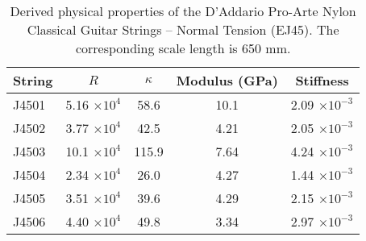 \begin{table}%
  \centering
  \caption{\label{tbl:ej45_props} Derived physical properties of the D'Addario Pro-Arte Nylon Classical Guitar Strings -- Normal Tension (EJ45). The corresponding scale length is 650 mm.}
    \begin{tabular}{lcccc}
    \hline \hline
    String  & $R$ & $\kappa$ & Modulus (GPa) & Stiffness \\
    \hline
    J4501 & 5.16 $\times 10^{4}$ & 58.6  & 10.1 & 2.09 $\times 10^{-3}$ \\
    J4502 & 3.77 $\times 10^{4}$ & 42.5  & 4.21 & 2.05 $\times 10^{-3}$ \\
    J4503 & 10.1 $\times 10^{4}$ & 115.9 & 7.64 & 4.24 $\times 10^{-3}$ \\
    J4504 & 2.34 $\times 10^{4}$ & 26.0  & 4.27 & 1.44 $\times 10^{-3}$ \\
    J4505 & 3.51 $\times 10^{4}$ & 39.6  & 4.29 & 2.15 $\times 10^{-3}$ \\
    J4506 & 4.40 $\times 10^{4}$ & 49.8  & 3.34 & 2.97 $\times 10^{-3}$ \\
    \hline
    \end{tabular}%
  \label{tab:addlabel}%
\end{table}%


